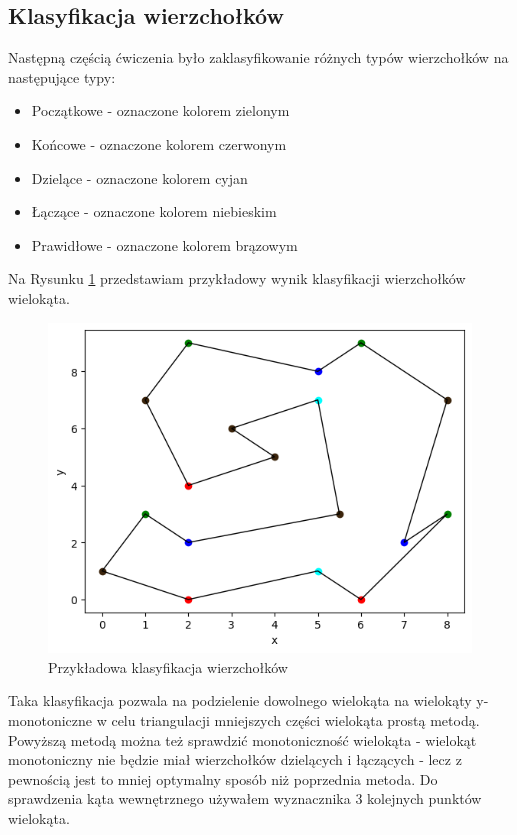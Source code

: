 \documentclass[a4paper]{article}
\begin{document}
    \subsection{Klasyfikacja wierzchołków}
    Następną częścią ćwiczenia było zaklasyfikowanie różnych typów wierzchołków na następujące
    typy:
    \begin{itemize}
        \item Początkowe - oznaczone kolorem zielonym
        \item Końcowe - oznaczone kolorem czerwonym
        \item Dzielące - oznaczone kolorem cyjan
        \item Łączące - oznaczone kolorem niebieskim
        \item Prawidłowe - oznaczone kolorem brązowym 
    \end{itemize} 
    \noindent Na Rysunku \ref{fig:example_vertex_colors} przedstawiam przykładowy wynik klasyfikacji
    wierzchołków wielokąta.
    \begin{figure}[H]
        \centering
        \includegraphics{przykladowa_klasyfikacja.png}
        \caption{Przykładowa klasyfikacja wierzchołków}
        \label{fig:example_vertex_colors}
    \end{figure}
    \noindent Taka klasyfikacja pozwala na podzielenie dowolnego wielokąta na wielokąty y-monotoniczne w
    celu triangulacji mniejszych części wielokąta prostą metodą. Powyższą metodą można też sprawdzić 
    monotoniczność wielokąta - wielokąt monotoniczny nie będzie miał wierzchołków dzielących i łączących
     - lecz z pewnością jest to mniej optymalny sposób niż poprzednia metoda. Do 
    sprawdzenia kąta wewnętrznego używałem wyznacznika 3 kolejnych punktów wielokąta.
\end{document}
